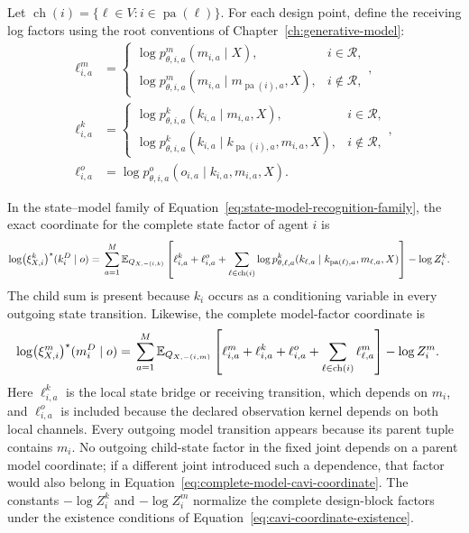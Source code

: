 Let \(\operatorname{ch}(i)=\{\ell\in V:i\in\operatorname{pa}(\ell)\}\). For each design point, define the receiving log factors using the root conventions of Chapter~\ref{ch:generative-model}:
\begin{align}
\ell_{i,a}^{m}
&=
\begin{cases}
\log p_{\theta,i,a}^{m}(m_{i,a}\mid X),&i\in\mathcal R,\\
\log p_{\theta,i,a}^{m}(m_{i,a}\mid m_{\operatorname{pa}(i),a},X),&i\notin\mathcal R,
\end{cases},
\label{eq:model-receiving-log-factor}\\
\ell_{i,a}^{k}
&=
\begin{cases}
\log p_{\theta,i,a}^{k}(k_{i,a}\mid m_{i,a},X),&i\in\mathcal R,\\
\log p_{\theta,i,a}^{k}(k_{i,a}\mid k_{\operatorname{pa}(i),a},m_{i,a},X),&i\notin\mathcal R,
\end{cases},
\label{eq:state-receiving-log-factor}\\
\ell_{i,a}^{o}
&=\log p_{\theta,i,a}^{o}(o_{i,a}\mid k_{i,a},m_{i,a},X).
\label{eq:observation-log-factor}
\end{align}

In the state--model family of Equation~\eqref{eq:state-model-recognition-family}, the exact coordinate for the complete state factor of agent \(i\) is
\begin{align}
\log \bigl(\xi^k_{X,i}\bigr)^\star(k_i^D\mid o)
={}&\sum_{a=1}^{M}\mathbb E_{Q_{X,-(i,k)}}\left[
\ell_{i,a}^{k}+\ell_{i,a}^{o}
+\sum_{\ell\in\operatorname{ch}(i)}
\log p_{\theta,\ell,a}^{k}
(k_{\ell,a}\mid k_{\operatorname{pa}(\ell),a},m_{\ell,a},X)
\right]
-\log Z_i^k.
\label{eq:complete-state-cavi-coordinate}
\end{align}
The child sum is present because \(k_i\) occurs as a conditioning variable in every outgoing state transition. Likewise, the complete model-factor coordinate is
\begin{align}
\log \bigl(\xi^m_{X,i}\bigr)^\star(m_i^D\mid o)
={}&\sum_{a=1}^{M}\mathbb E_{Q_{X,-(i,m)}}\left[
\ell_{i,a}^{m}+\ell_{i,a}^{k}+\ell_{i,a}^{o}
+\sum_{\ell\in\operatorname{ch}(i)}
\ell_{\ell,a}^{m}
\right]
-\log Z_i^m.
\label{eq:complete-model-cavi-coordinate}
\end{align}
Here \(\ell_{i,a}^{k}\) is the local state bridge or receiving transition, which depends on \(m_i\), and \(\ell_{i,a}^{o}\) is included because the declared observation kernel depends on both local channels. Every outgoing model transition appears because its parent tuple contains \(m_i\). No outgoing child-state factor in the fixed joint depends on a parent model coordinate; if a different joint introduced such a dependence, that factor would also belong in Equation~\eqref{eq:complete-model-cavi-coordinate}. The constants \(-\log Z_i^k\) and \(-\log Z_i^m\) normalize the complete design-block factors under the existence conditions of Equation~\eqref{eq:cavi-coordinate-existence}.

